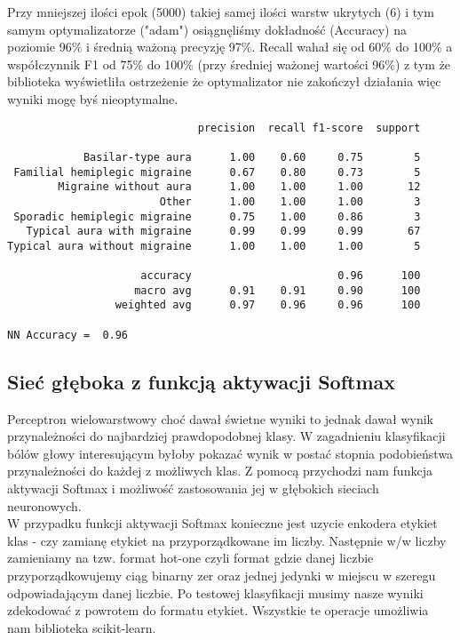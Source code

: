 Przy mniejszej ilości epok (5000) takiej samej ilości warstw ukrytych (6) i tym samym optymalizatorze ("adam") osiągnęliśmy dokładność (Accuracy) na poziomie 96\% i średnią ważoną precyzję 97\%. Recall wahał się od 60\% do 100\% a współczynnik F1 od 75\% do 100\% (przy średniej ważonej wartości 96\%) z tym że biblioteka wyświetliła ostrzeżenie że optymalizator nie zakończył działania więc wyniki mogę byś nieoptymalne.\\

\begin{verbatim}
                              precision  recall f1-score  support

            Basilar-type aura      1.00    0.60     0.75        5
 Familial hemiplegic migraine      0.67    0.80     0.73        5
        Migraine without aura      1.00    1.00     1.00       12
                        Other      1.00    1.00     1.00        3
 Sporadic hemiplegic migraine      0.75    1.00     0.86        3
   Typical aura with migraine      0.99    0.99     0.99       67
Typical aura without migraine      1.00    1.00     1.00        5

                     accuracy                       0.96      100
                    macro avg      0.91    0.91     0.90      100
                 weighted avg      0.97    0.96     0.96      100

NN Accuracy =  0.96
\end{verbatim}

\subsection{Sieć głęboka z funkcją aktywacji Softmax}
Perceptron wielowarstwowy choć dawał świetne wyniki to jednak dawał wynik przynależności do najbardziej prawdopodobnej klasy. W zagadnieniu klasyfikacji bólów głowy interesującym byłoby pokazać wynik w postać stopnia podobieństwa przynależności do każdej z możliwych klas. Z pomocą przychodzi nam funkcja aktywacji Softmax i możliwość zastosowania jej w głębokich sieciach neuronowych.\\

W przypadku funkcji aktywacji Softmax konieczne jest uzycie enkodera etykiet klas - czy zamianę etykiet na przyporządkowane im liczby. Następnie w/w liczby zamieniamy na tzw. format hot-one czyli format gdzie danej liczbie przyporządkowujemy ciąg binarny zer oraz jednej jedynki w miejscu w szeregu odpowiadającym danej liczbie. Po testowej klasyfikacji musimy nasze wyniki zdekodować z powrotem do formatu etykiet. Wszystkie te operacje umożliwia nam biblioteka scikit-learn.\\

